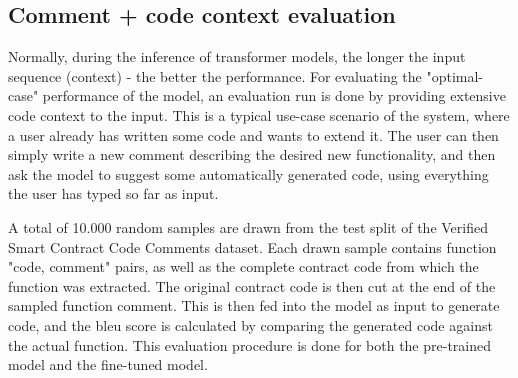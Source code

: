 



%    



\subsection{Comment + code context evaluation}
\label{sec:eval-rq1-comment-pluss-code-context}
Normally, during the inference of transformer models, the longer the input sequence (context) - the better the performance. For evaluating the "optimal-case" performance of the model, an evaluation run is done by providing extensive code context to the input. This is a typical use-case scenario of the system, where a user already has written some code and wants to extend it. The user can then simply write a new comment describing the desired new functionality, and then ask the model to suggest some automatically generated code, using everything the user has typed so far as input.

A total of 10.000 random samples are drawn from the test split of the Verified Smart Contract Code Comments dataset. Each drawn sample contains function "code, comment" pairs, as well as the complete contract code from which the function was extracted. The original contract code is then cut at the end of the sampled function comment. This is then fed into the model as input to generate code, and the \gls{bleu} score is calculated by comparing the generated code against the actual function. This evaluation procedure is done for both the pre-trained model and the fine-tuned model. 

